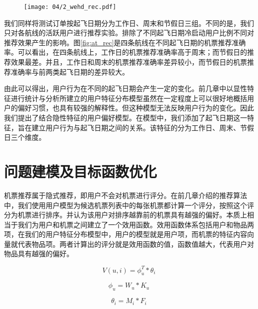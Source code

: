 \begin{figure}[!h]
 \centering
 \texttt{[image: 04/2\_wehd\_rec.pdf]}
\end{figure}

我们同样将测试订单按起飞日期分为工作日、周末和节假日三组。不同的是，我们只对各航线的活跃用户进行推荐实验。排除了不同起飞日期冷启动用户比例不同对推荐效果产生的影响。图\ref{fig:at_rec}是四条航线在不同起飞日期的机票推荐准确率。可以看出，在四条航线上，工作日的机票推荐准确率高于周末；而节假日的推荐效果最差。并且，工作日和周末的机票推荐准确率差异较小，而节假日的机票推荐准确率与前两类起飞日期的差异较大。

由此可以得出，用户行为在不同的起飞日期会产生一定的变化。前几章中以显性特征进行统计与分析所建立的用户特征分布模型虽然在一定程度上可以很好地概括用户的偏好习惯，也具有较强的解释性。但这种模型无法反映用户行为的变化。因此我们提出了结合隐性特征的用户偏好模型。在模型中，我们添加了起飞日期这一特征，旨在建立用户行为与起飞日期之间的关系。该特征的分为工作日、周末、节假日三个维度。

\section{问题建模及目标函数优化}

机票推荐属于隐式推荐，即用户不会对机票进行评分。在前几章介绍的推荐算法中，我们使用用户模型为候选机票列表中的每张机票都计算一个评分，按照这个评分为机票进行排序。并认为该用户对排序越靠前的机票具有越强的偏好。本质上相当于我们为用户和机票之间建立了一个效用函数。效用函数体系包括用户和物品两项，在我们的用户特征分布模型中，用户的模型就是用户项，而机票的特征内容向量就代表物品项。两者计算出的评分就是效用函数的值，函数值越大，代表用户对物品具有越强的偏好。

\begin{equation}
\label{eq:utility}
	V(u,i) = \phi_u^T * \theta_i
\end{equation}

\begin{equation}
\label{eq:phi_u}
	\phi_u = W_u * K_u
\end{equation}

\begin{equation}
\label{eq:theta_i}
	\theta_i = M_i * F_i
\end{equation}

